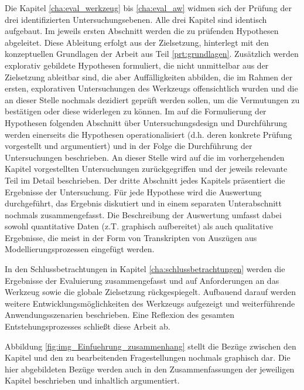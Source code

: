 Die Kapitel \ref{cha:eval_werkzeug} bis \ref{cha:eval_aw} widmen sich der Prüfung der drei identifizierten Untersuchungsebenen. Alle drei Kapitel sind identisch aufgebaut. Im jeweils ersten Abschnitt werden die zu prüfenden Hypothesen abgeleitet. Diese Ableitung erfolgt aus der Zielsetzung, hinterlegt mit den konzeptuellen Grundlagen der Arbeit aus Teil \ref{prt:grundlagen}. Zusätzlich werden explorativ gebildete Hypothesen formuliert, die nicht unmittelbar aus der Zielsetzung ableitbar sind, die aber Auffälligkeiten abbilden, die im Rahmen der ersten, explorativen Untersuchungen des Werkzeugs offensichtlich wurden und die an dieser Stelle nochmals dezidiert geprüft werden sollen, um die Vermutungen zu bestätigen oder diese  widerlegen zu können. Im auf die Formulierung der Hypothesen folgenden Abschnitt über Untersuchungsdesign und Durchführung werden einerseits die Hypothesen operationalisiert (d.h. deren konkrete Prüfung vorgestellt und argumentiert) und in der Folge die Durchführung der Untersuchungen beschrieben. An dieser Stelle wird auf die im vorhergehenden Kapitel vorgestellten Untersuchungen zurückgegriffen und der jeweils relevante Teil im Detail beschrieben. Der dritte Abschnitt jedes Kapitels präsentiert die Ergebnisse der Untersuchung. Für jede Hypothese wird die Auswertung durchgeführt, das Ergebnis diskutiert und in einem separaten Unterabschnitt nochmals zusammengefasst. Die Beschreibung der Auswertung umfasst dabei sowohl quantitative Daten (z.T. graphisch aufbereitet) als auch qualitative Ergebnisse, die meist in der Form von Transkripten von Auszügen aus Modellierungsprozessen eingefügt werden.

In den Schlussbetrachtungen in Kapitel \ref{cha:schlussbetrachtungen} werden die Ergebnisse der Evaluierung zusammengefasst und auf Anforderungen an das Werkzeug sowie die globale Zielsetzung rückgespiegelt. Aufbauend darauf werden weitere Entwicklungsmöglichkeiten des Werkzeugs aufgezeigt und weiterführende Anwendungsszenarien beschrieben. Eine Reflexion des gesamten Entstehungsprozesses schließt diese Arbeit ab.

Abbildung \ref{fig:img_Einfuehrung_zusammenhang} stellt die Bezüge zwischen den Kapitel und den zu bearbeitenden Fragestellungen nochmals graphisch dar. Die hier abgebildeten Bezüge werden auch in den Zusammenfassungen der jeweiligen Kapitel beschrieben und inhaltlich argumentiert.

